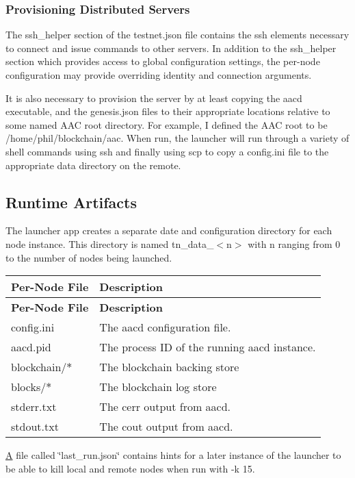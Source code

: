 \subsubsection*{Provisioning Distributed Servers}

The ssh\+\_\+helper section of the testnet.\+json file contains the ssh elements necessary to connect and issue commands to other servers. In addition to the ssh\+\_\+helper section which provides access to global configuration settings, the per-\/node configuration may provide overriding identity and connection arguments.

It is also necessary to provision the server by at least copying the aacd executable, and the genesis.\+json files to their appropriate locations relative to some named A\+AC root directory. For example, I defined the A\+AC root to be {\ttfamily /home/phil/blockchain/aac}. When run, the launcher will run through a variety of shell commands using ssh and finally using scp to copy a config.\+ini file to the appropriate data directory on the remote.

\subsection*{Runtime Artifacts}

The launcher app creates a separate date and configuration directory for each node instance. This directory is named {\ttfamily tn\+\_\+data\+\_\+$<$n$>$} with n ranging from 0 to the number of nodes being launched.

\tabulinesep=1mm
\begin{longtabu} spread 0pt [c]{*{2}{|X[-1]}|}
\hline
\rowcolor{\tableheadbgcolor}\textbf{ Per-\/\+Node File  }&\textbf{ Description   }\\
\endfirsthead
\hline
\endfoot
\hline
\rowcolor{\tableheadbgcolor}\textbf{ Per-\/\+Node File  }&\textbf{ Description   }\\
\endhead
config.\+ini  &The aacd configuration file.   \\
aacd.\+pid  &The process ID of the running aacd instance.   \\
blockchain/$\ast$  &The blockchain backing store   \\
blocks/$\ast$  &The blockchain log store   \\
stderr.\+txt  &The cerr output from aacd.   \\
stdout.\+txt  &The cout output from aacd.   \\
\end{longtabu}


\mbox{\hyperlink{struct_a}{A}} file called \char`\"{}last\+\_\+run.\+json\char`\"{} contains hints for a later instance of the launcher to be able to kill local and remote nodes when run with -\/k 15. 